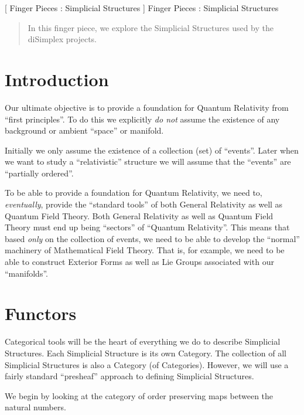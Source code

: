 
[
  Finger Pieces : Simplicial Structures
]{
  Finger Pieces : Simplicial Structures
}
\author{Stephen Gaito}

\maketitle

\begin{abstract}
  In this finger piece, we explore the Simplicial Structures used by the
  diSimplex projects.
\end{abstract}


\section*{Introduction}

Our ultimate objective is to provide a foundation for Quantum Relativity from
``first principles''. To do this we explicitly \emph{do not} assume the
existence of any background or ambient ``space'' or manifold.

Initially we only assume the existence of a collection (set) of ``events''.
Later when we want to study a ``relativistic'' structure we will assume that
the ``events'' are ``partially ordered''.

To be able to provide a foundation for Quantum Relativity, we need to,
\emph{eventually}, provide the ``standard tools'' of both General Relativity as
well as Quantum Field Theory. Both General Relativity as well as Quantum Field
Theory must end up being ``sectors'' of ``Quantum Relativity''. This means that
based \emph{only} on the collection of events, we need to be able to develop the
``normal'' machinery of Mathematical Field Theory. That is, for example, we need
to be able to construct Exterior Forms as well as Lie Groups associated with our
``manifolds''.

\section*{Functors}

Categorical tools will be the heart of everything we do to describe Simplicial
Structures. Each Simplicial Structure is its own Category. The collection of all
Simplicial Structures is also a Category (of Categories). However, we will use a
fairly standard ``presheaf'' approach to defining Simplicial Structures.

We begin by looking at the category of order preserving maps between the natural
numbers.

